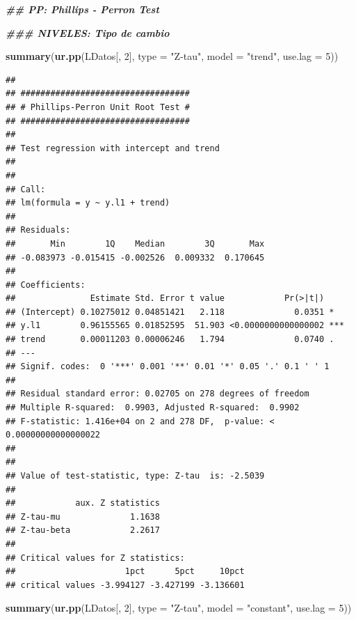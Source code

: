 \documentclass[
]{book}
\newenvironment{Shaded}{\begin{snugshade}}{\end{snugshade}}
\newcommand{\AttributeTok}[1]{\textcolor[rgb]{0.13,0.29,0.53}{#1}}
\newcommand{\DecValTok}[1]{\textcolor[rgb]{0.00,0.00,0.81}{#1}}
\newcommand{\DocumentationTok}[1]{\textcolor[rgb]{0.56,0.35,0.01}{\textbf{\textit{#1}}}}
\newcommand{\FunctionTok}[1]{\textcolor[rgb]{0.13,0.29,0.53}{\textbf{#1}}}
\newcommand{\NormalTok}[1]{#1}
\newcommand{\StringTok}[1]{\textcolor[rgb]{0.31,0.60,0.02}{#1}}
\begin{document}
\begin{Shaded}
\begin{Highlighting}[]
\DocumentationTok{\#\# PP: Phillips {-} Perron Test}

\DocumentationTok{\#\#\# NIVELES: Tipo de cambio}

\FunctionTok{summary}\NormalTok{(}\FunctionTok{ur.pp}\NormalTok{(LDatos[, }\DecValTok{2}\NormalTok{], }\AttributeTok{type =} \StringTok{"Z{-}tau"}\NormalTok{, }\AttributeTok{model =} \StringTok{"trend"}\NormalTok{, }\AttributeTok{use.lag =} \DecValTok{5}\NormalTok{))}
\end{Highlighting}
\end{Shaded}

\begin{verbatim}
## 
## ################################## 
## # Phillips-Perron Unit Root Test # 
## ################################## 
## 
## Test regression with intercept and trend 
## 
## 
## Call:
## lm(formula = y ~ y.l1 + trend)
## 
## Residuals:
##       Min        1Q    Median        3Q       Max 
## -0.083973 -0.015415 -0.002526  0.009332  0.170645 
## 
## Coefficients:
##               Estimate Std. Error t value            Pr(>|t|)    
## (Intercept) 0.10275012 0.04851421   2.118              0.0351 *  
## y.l1        0.96155565 0.01852595  51.903 <0.0000000000000002 ***
## trend       0.00011203 0.00006246   1.794              0.0740 .  
## ---
## Signif. codes:  0 '***' 0.001 '**' 0.01 '*' 0.05 '.' 0.1 ' ' 1
## 
## Residual standard error: 0.02705 on 278 degrees of freedom
## Multiple R-squared:  0.9903, Adjusted R-squared:  0.9902 
## F-statistic: 1.416e+04 on 2 and 278 DF,  p-value: < 0.00000000000000022
## 
## 
## Value of test-statistic, type: Z-tau  is: -2.5039 
## 
##            aux. Z statistics
## Z-tau-mu              1.1638
## Z-tau-beta            2.2617
## 
## Critical values for Z statistics: 
##                      1pct      5pct     10pct
## critical values -3.994127 -3.427199 -3.136601
\end{verbatim}

\begin{Shaded}
\begin{Highlighting}[]
\FunctionTok{summary}\NormalTok{(}\FunctionTok{ur.pp}\NormalTok{(LDatos[, }\DecValTok{2}\NormalTok{], }\AttributeTok{type =} \StringTok{"Z{-}tau"}\NormalTok{, }\AttributeTok{model =} \StringTok{"constant"}\NormalTok{, }\AttributeTok{use.lag =} \DecValTok{5}\NormalTok{))}
\end{Highlighting}
\end{Shaded}
\end{document}
